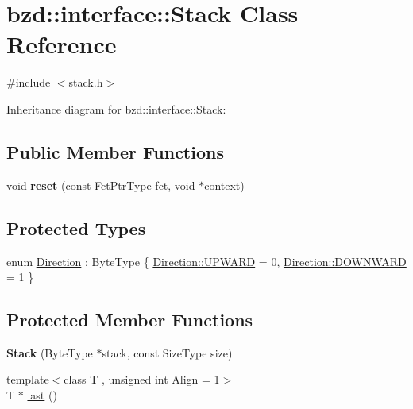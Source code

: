 \hypertarget{classbzd_1_1interface_1_1Stack}{}\section{bzd\+:\+:interface\+:\+:Stack Class Reference}
\label{classbzd_1_1interface_1_1Stack}


{\ttfamily \#include $<$stack.\+h$>$}



Inheritance diagram for bzd\+:\+:interface\+:\+:Stack\+:
\subsection*{Public Member Functions}
\begin{DoxyCompactItemize}
\item 
\mbox{\label{classbzd_1_1interface_1_1Stack_a5088183155c7e599606d80c1ab6623fb}} 
void {\bfseries reset} (const Fct\+Ptr\+Type fct, void $\ast$context)
\end{DoxyCompactItemize}
\subsection*{Protected Types}
\begin{DoxyCompactItemize}
\item 
enum \hyperlink{classbzd_1_1interface_1_1Stack_aee39c37ff1b2f48dcfd24a09c0999034}{Direction} \+: Byte\+Type \{ \hyperlink{classbzd_1_1interface_1_1Stack_aee39c37ff1b2f48dcfd24a09c0999034afb48997617f324a0afeff3ad1d1d59ad}{Direction\+::\+U\+P\+W\+A\+RD} = 0, 
\hyperlink{classbzd_1_1interface_1_1Stack_aee39c37ff1b2f48dcfd24a09c0999034acf045327606e788dbe14630a376af70e}{Direction\+::\+D\+O\+W\+N\+W\+A\+RD} = 1
 \}
\end{DoxyCompactItemize}
\subsection*{Protected Member Functions}
\begin{DoxyCompactItemize}
\item 
\mbox{\label{classbzd_1_1interface_1_1Stack_a800684e7cd937ce9cf99cdd6bb3197aa}} 
{\bfseries Stack} (Byte\+Type $\ast$stack, const Size\+Type size)
\item 
{\footnotesize template$<$class T , unsigned int Align = 1$>$ }\\T $\ast$ \hyperlink{classbzd_1_1interface_1_1Stack_a8319403ce82128a0805bd99de0b84893}{last} ()
\end{DoxyCompactItemize}
